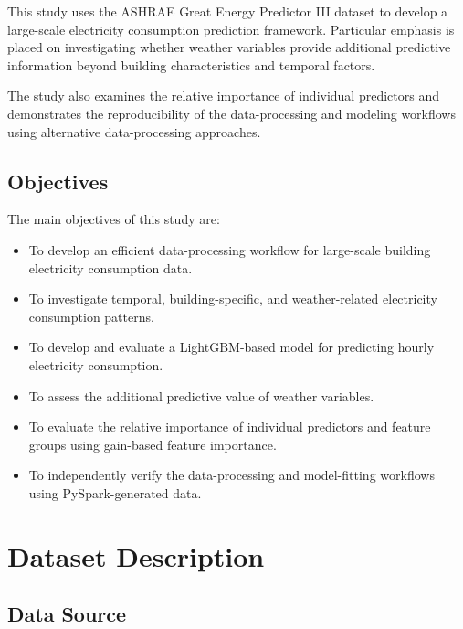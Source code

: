 \documentclass[12pt]{article}
\begin{document}
This study uses the ASHRAE Great Energy Predictor III dataset to develop a large-scale electricity consumption prediction framework. Particular emphasis is placed on investigating whether weather variables provide additional predictive information beyond building characteristics and temporal factors.

The study also examines the relative importance of individual predictors and demonstrates the reproducibility of the data-processing and modeling workflows using alternative data-processing approaches.

\subsection{Objectives}

The main objectives of this study are:

\begin{itemize}
    \item To develop an efficient data-processing workflow for large-scale building electricity consumption data.

    \item To investigate temporal, building-specific, and weather-related electricity consumption patterns.

    \item To develop and evaluate a LightGBM-based model for predicting hourly electricity consumption.

    \item To assess the additional predictive value of weather variables.

    \item To evaluate the relative importance of individual predictors and feature groups using gain-based feature importance.

    \item To independently verify the data-processing and model-fitting workflows using PySpark-generated data.
\end{itemize}

\section{Dataset Description}

\subsection{Data Source}
\end{document}
